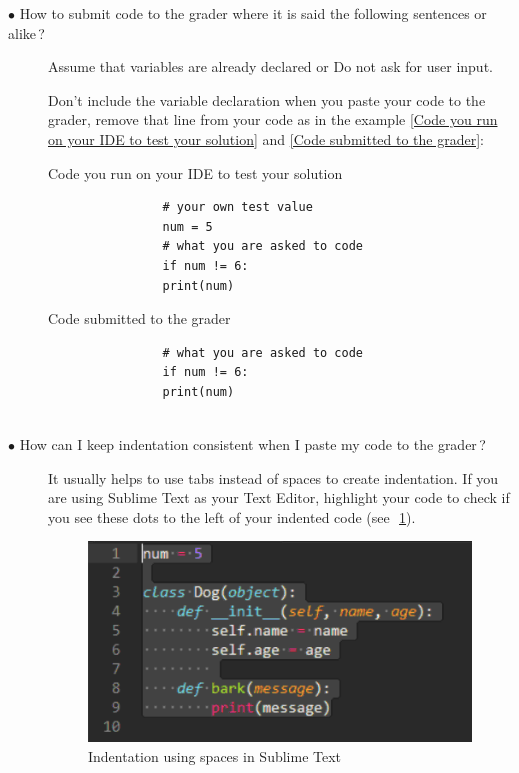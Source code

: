 \documentclass{article}
\newcommand{\question}[1]{\item[$\bullet$ #1] \hfil}
\newenvironment{answer}{}{}
\newenvironment{faq}{\begin{description}}{\end{description}}
\begin{document}
\begin{faq}
		\question{How to submit code to the grader where it is said the following sentences or alike\,?}
		
		\textcolor[HTML]{900090}{Assume that variables are already declared} or \textcolor[HTML]{900090}{Do not ask for user input}.
		
		\begin{answer}
			Don't include the variable declaration when you paste your code to the
			grader, remove that line from your code as in the example \textcolor{blue}{\ref{Code you run on your IDE to test your solution}} and \textcolor{blue}{\ref{Code submitted to the grader}}:
			
			\begin{table}[htb]
				\caption{Code you run on your IDE to test your solution}
				\label{Code you run on your IDE to test your solution}
				\begin{verbatim}
				# your own test value
				num = 5
				# what you are asked to code
				if num != 6:
				print(num)  
				\end{verbatim}
			\end{table}
			
			\begin{table}[htb]
				\caption{Code submitted to the grader}
				\label{Code submitted to the grader}
				\begin{verbatim}
				# what you are asked to code
				if num != 6:
				print(num)
				
				\end{verbatim}
			\end{table}
		\end{answer}
		
		\question{How can I keep indentation consistent when I paste my code to the grader\,?}
		
		\begin{answer}
			It usually helps to use tabs instead of spaces to create indentation.
			If you are using Sublime Text as your Text Editor, highlight your code to check if you see
			these dots to the left of your indented code (see~\figurename\,\textcolor{blue}{\ref{Indentation using spaces in Sublime Text}}).
			
			\begin{figure}[htb]
				\centering
				\caption{Indentation using spaces in Sublime Text} \label{Indentation using spaces in Sublime Text}
				\includegraphics{dots_indentation}
			\end{figure}
			

\end{answer}
\end{faq}
\end{document}
